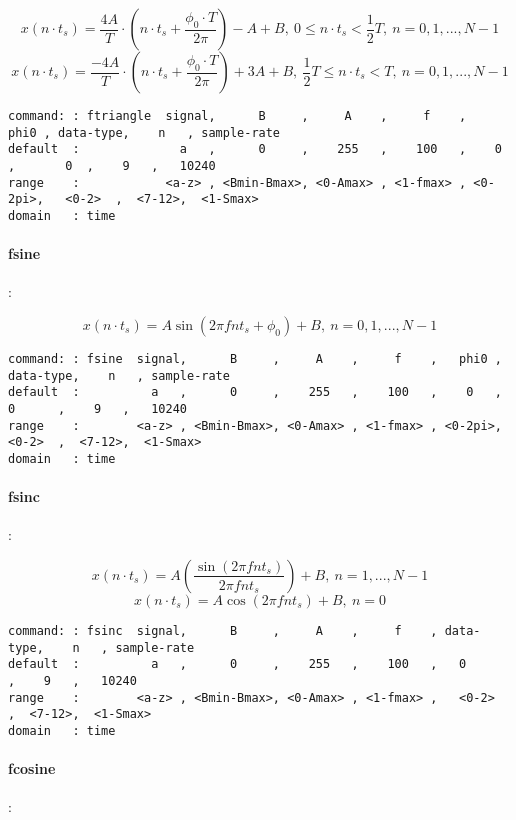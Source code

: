 \documentclass{report}
\newcommand{\bc}{\scriptsize}
\newcommand{\ec}{\normalsize}
\begin{document}
\[ x(n \cdot t_{s}) = \frac{4A}{T}\cdot(n \cdot t_{s} + \frac{\phi_{0} \cdot T}{2\pi})-A+B,~ 0 \leq n \cdot t_{s} < \frac{1}{2}T,~ n=0,1,...,N-1 \]
\[ x(n \cdot t_{s}) = \frac{-4A}{T}\cdot(n \cdot t_{s} + \frac{\phi_{0} \cdot T}{2\pi})+3A+B,~ \frac{1}{2}T \leq n \cdot t_{s} < T,~ n=0,1,...,N-1 \]

\bc
\begin{verbatim}
command: : ftriangle  signal,      B     ,     A    ,     f    ,   phi0 , data-type,    n   , sample-rate
default  :              a   ,      0     ,    255   ,    100   ,    0   ,       0  ,    9   ,   10240
range    :            <a-z> , <Bmin-Bmax>, <0-Amax> , <1-fmax> , <0-2pi>,   <0-2>  ,  <7-12>,  <1-Smax>
domain   : time
\end{verbatim}
\ec

\paragraph{fsine}:

\[ x(n \cdot t_{s}) = A \sin(2\pi fnt_{s} + \phi_{0}) + B,~ n=0,1,...,N-1 \]

\bc
\begin{verbatim}
command: : fsine  signal,      B     ,     A    ,     f    ,   phi0 , data-type,    n   , sample-rate
default  :          a   ,      0     ,    255   ,    100   ,    0   ,   0      ,    9   ,   10240
range    :        <a-z> , <Bmin-Bmax>, <0-Amax> , <1-fmax> , <0-2pi>,   <0-2>  ,  <7-12>,  <1-Smax>
domain   : time
\end{verbatim}
\ec

\paragraph{fsinc}:

\[ x(n \cdot t_{s}) = A \left( \frac{\sin (2\pi fnt_{s})}{2\pi fnt_{s}} \right) + B,~ n=1,...,N-1 \]
\[ x(n \cdot t_{s}) = A \cos (2\pi fnt_{s})+B,~ n=0 \]

\bc
\begin{verbatim}
command: : fsinc  signal,      B     ,     A    ,     f    , data-type,    n   , sample-rate
default  :          a   ,      0     ,    255   ,    100   ,   0      ,    9   ,   10240
range    :        <a-z> , <Bmin-Bmax>, <0-Amax> , <1-fmax> ,   <0-2>  ,  <7-12>,  <1-Smax>
domain   : time
\end{verbatim}
\ec

\paragraph{fcosine}:
\end{document}
